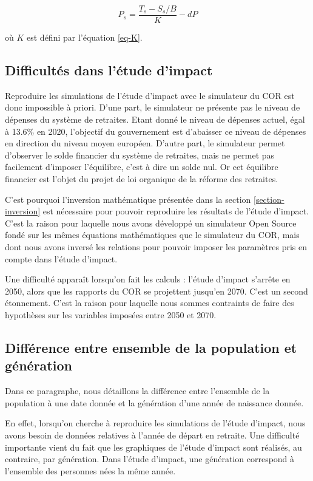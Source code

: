 \documentclass[10pt]{article}
\begin{document}
$$
P_s = \frac{T_s - S_s / B}{K} - dP
$$

où $K$ est défini par l'équation \ref{eq-K}. 


\subsection{Difficultés dans l'étude d'impact}

Reproduire les simulations de l'étude d'impact avec le simulateur du COR 
est donc impossible à priori. 
D'une part, le simulateur ne présente pas le niveau de dépenses du système 
de retraites. 
Etant donné le niveau de dépenses actuel, égal à 13.6\% en 2020, 
l'objectif du gouvernement est d'abaisser ce niveau de dépenses 
en direction du niveau moyen européen. 
D'autre part, le simulateur permet d'observer le solde financier du système de retraites, 
mais ne permet pas facilement d'imposer l'équilibre, c'est à dire un solde nul. 
Or cet équilibre financier est l'objet du projet de loi organique de la réforme 
des retraites. 

C'est pourquoi l'inversion mathématique présentée dans la section \ref{section-inversion} 
est nécessaire pour pouvoir reproduire les résultats de l'étude d'impact. 
C'est la raison pour laquelle nous avons développé un simulateur Open Source 
\cite{SimulateurScherrer} fondé sur les mêmes équations mathématiques 
que le simulateur du COR, mais dont nous avons inversé les relations pour 
pouvoir imposer les paramètres pris en compte dans l'étude d'impact. 

Une difficulté apparaît lorsqu'on fait les calculs : 
l'étude d'impact s'arrête en 2050, alors que les rapports du COR 
se projettent jusqu'en 2070. 
C'est un second étonnement. 
C'est la raison pour laquelle nous sommes contraints de faire des 
hypothèses sur les variables imposées entre 2050 et 2070. 


\subsection{Différence entre ensemble de la population et génération}

Dans ce paragraphe, nous détaillons la différence entre 
l'ensemble de la population à une date donnée et la génération d'une année 
de naissance donnée. 

En effet, lorsqu'on cherche à reproduire les simulations de l'étude d'impact, nous 
avons besoin de données relatives à l'année de départ en retraite. 
Une difficulté importante vient du fait que les graphiques de l'étude 
d'impact sont réalisés, au contraire, par génération. 
Dans l'étude d'impact, une génération correspond à l'ensemble des personnes 
nées la même année. 
\end{document}
